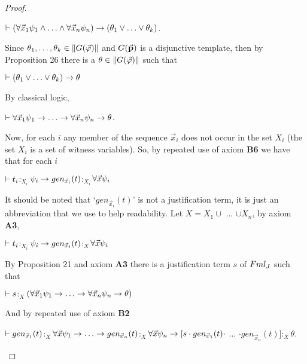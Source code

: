 \begin{proof}
	\begin{center}
		$\teo (\todo \vec{x}_{1} \psi_{1} \e \dots \e \todo \vec{x}_{n} \psi_{n}) \impli  (\theta_{1} \ou \dots \ou  \theta_{k})$.
	\end{center}
	
	\qquad Since $\theta_{1}, \dots, \theta_{k} \in \Arrowvert G(\vec{\varphi}) \Arrowvert$ and $G(\vec{\textbf{p}})$ is a disjunctive template, then by Proposition 26 there is a $\theta \in \Arrowvert G(\vec{\varphi}) \Arrowvert$ such that 
	
	\begin{center}
		$\teo (\theta_{1} \ou \dots \ou  \theta_{k}) \impli \theta$
	\end{center}
By classical logic,
	
	\begin{center}
		$\teo \todo \vec{x}_{1} \psi_{1} \impli \dots \impli \todo \vec{x}_{n} \psi_{n} \impli  \theta$.
	\end{center}
	
	\qquad Now, for each $i$ any member of the sequence $\vec{x}_{i}$ does not occur in the set $X_{i}$ (the set $X_{i}$ is a set of witness variables). So, by repeated use of axiom \textbf{B6} we have that for each $i$
	
	\begin{center}
		$\vdash t_{i}$$:_{X_{i}}$$\psi_{i}\rightarrow gen_{\vec{x}_{i}}(t)$$:_{X_{i}}$$\forall \vec{x}\psi_{i}$
	\end{center}
	
	\qquad It should be noted that `$gen_{\vec{x}_{i}}(t)$' is not a justification term, it is just an abbreviation that we use to help readability. Let $X = X_{1}\cup$ $\dots$ $\cup X_{n}$, by axiom \textbf{A3},
	
	\begin{center}
		$\vdash t_{i}$$:_{X_{i}}$$\psi_{i}\rightarrow gen_{\vec{x}_{i}}(t)$$:_{X}$$\forall \vec{x}\psi_{i}$
	\end{center}
	
	\qquad By Proposition 21 and axiom \textbf{A3} there is a justification term $s$ of $Fml_{J}$ such that 
	
	\begin{center}
		$\vdash s$$:_{X}$$(\todo \vec{x}_{1} \psi_{1} \impli \dots \impli \todo \vec{x}_{n} \psi_{n} \impli  \theta)$
	\end{center}
And by repeated use of axiom \textbf{B2}
	
	
	\begin{center}
		$\vdash gen_{\vec{x}_{1}}(t)$$:_{X}$$\todo \vec{x}\psi_{1}\impli \dots \impli gen_{\vec{x}_{n}}(t)$$:_{X}$$\forall \vec{x}\psi_{n}\rightarrow  [s\cdot gen_{\vec{x}_{1}}(t) \cdot$ $\dots$ $\cdot gen_{\vec{x}_{n}}(t) ]$$:_{X}$$\theta$.
	\end{center}
	

\end{proof}
